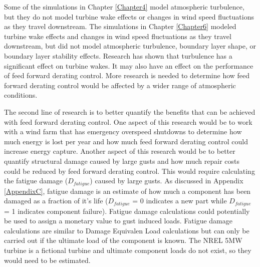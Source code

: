 Some of the simulations in Chapter \ref{Chapter4} model atmospheric turbulence, but they do not model turbine wake effects or changes in wind speed fluctuations as they travel downstream. The simulations in Chapter \ref{Chapter6} modeled  turbine wake effects and changes in wind speed fluctuations as they travel downstream, but did not model atmospheric turbulence, boundary layer shape, or boundary layer stability effects. Research has shown that turbulence has a significant effect on turbine wakes.\cite{troldborg2015, troldborg2010,madsen2010} It may also have an effect on the performance of feed forward derating control. More research is needed to determine how feed forward derating control would be affected by a wider range of atmospheric conditions.

The second line of research is to better quantify the benefits that can be achieved with feed forward derating control. One aspect of this research would be to work with a wind farm that has emergency overspeed shutdowns to determine how much energy is lost per year and how much feed forward derating control could increase energy capture. Another aspect of this research would be to better quantify structural damage caused by large gusts and how much repair costs could be reduced by feed forward derating control. This would require calculating the fatigue damage ($D_{fatigue}$) caused by large gusts. As discussed in Appendix \ref{AppendixC}, fatigue damage is an estimate of how much a component has been damaged as a fraction of it's life ($D_{fatigue}$ = 0 indicates a new part while $D_{fatigue}$ = 1 indicates component failure). Fatigue damage calculations could potentially be used to assign a monetary value to gust induced loads. Fatigue damage calculations are similar to Damage Equivalen Load calculations but can only be carried out if the ultimate load of the component is known. The NREL 5MW turbine is a fictional turbine and ultimate component loads do not exist, so they would need to be estimated. 